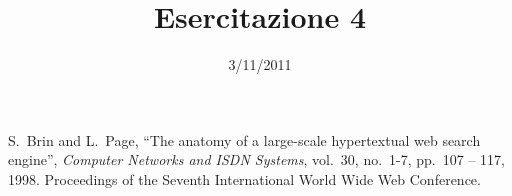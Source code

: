 \documentclass[10pt,a4paper,english,italian]{article}
\title{Esercitazione 4}
\date{3/11/2011}
\begin{document}
\lstset{language=[ISO]C++}
\maketitle









%

\begin{thebibliography}{9}

     S.~Brin and L.~Page, ``The anatomy of a large-scale hypertextual web search
            engine'', {\em Computer Networks and ISDN Systems}, vol.~30, no.~1-7, pp.~107
            -- 117, 1998. Proceedings of the Seventh International World Wide Web Conference.

\end{thebibliography}
\end{document}
